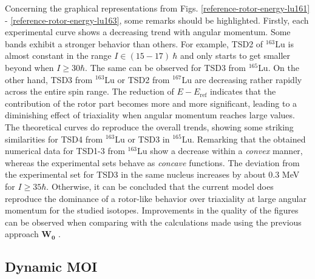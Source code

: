 Concerning the graphical representations from Figs. \ref{reference-rotor-energy-lu161} - \ref{reference-rotor-energy-lu163}, some remarks should be highlighted. Firstly, each experimental curve shows a decreasing trend with angular momentum. Some bands exhibit a stronger behavior than others. For example, TSD2 of $^{163}$Lu is almost constant in the range $I\in(15-17)\ \hbar$ and only starts to get smaller beyond when $I\geq 30\hbar$. The same can be observed for TSD3 from $^{165}$Lu. On the other hand, TSD3 from $^{163}$Lu or TSD2 from $^{167}$Lu are decreasing rather rapidly across the entire spin range. The reduction of $E-E_\text{ref}$ indicates that the contribution of the rotor part becomes more and more significant, leading to a diminishing effect of triaxiality when angular momentum reaches large values. The theoretical curves do reproduce the overall trends, showing some striking similarities for TSD4 from $^{163}$Lu or TSD3 in $^{165}$Lu. Remarking that the obtained numerical data for TSD1-3 from $^{163}$Lu show a decrease within a \emph{convex} manner, whereas the experimental sets behave as \emph{concave} functions. The deviation from the experimental set for TSD3 in the same nucleus increases by about 0.3 MeV for $I\geq 35\hbar$. Otherwise, it can be concluded that the current model does reproduce the dominance of a rotor-like behavior over triaxiality at large angular momentum for the studied isotopes. Improvements in the quality of the figures can be observed when comparing with the calculations made using the previous approach $\mathbf{W_0}$ \cite{raduta2018wobbling}.

\subsection{Dynamic MOI}

